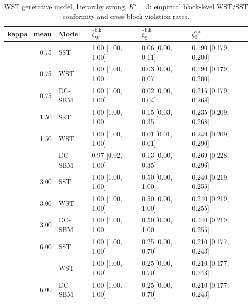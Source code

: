 \begin{table}
\centering
\caption{WST generative model, hierarchy strong, $K^\star=3$: empirical block-level WST/SST conformity and cross-block violation rates.}
\centering
\begin{tabular}[t]{rllll}
\toprule
kappa_mean & Model & $\widehat\zeta_{\mathrm{W}}^{\mathrm{blk}}$ & $\widehat\zeta_{\mathrm{S}}^{\mathrm{blk}}$ & $\zeta^{\mathrm{viol}}_{\hat z}$\\
\midrule
0.75 & SST & 1.00 [1.00, 1.00] & 0.06 [0.00, 0.11] & 0.190 [0.179, 0.200]\\
0.75 & WST & 1.00 [1.00, 1.00] & 0.03 [0.00, 0.07] & 0.190 [0.179, 0.200]\\
0.75 & DC-SBM & 1.00 [1.00, 1.00] & 0.02 [0.00, 0.04] & 0.216 [0.179, 0.268]\\
1.50 & SST & 1.00 [1.00, 1.00] & 0.15 [0.03, 0.35] & 0.235 [0.209, 0.268]\\
1.50 & WST & 1.00 [1.00, 1.00] & 0.01 [0.01, 0.01] & 0.249 [0.209, 0.290]\\
\addlinespace
1.50 & DC-SBM & 0.97 [0.92, 1.00] & 0.13 [0.00, 0.35] & 0.269 [0.228, 0.296]\\
3.00 & SST & 1.00 [1.00, 1.00] & 0.50 [0.00, 1.00] & 0.240 [0.219, 0.255]\\
3.00 & WST & 1.00 [1.00, 1.00] & 0.50 [0.00, 1.00] & 0.240 [0.219, 0.255]\\
3.00 & DC-SBM & 1.00 [1.00, 1.00] & 0.50 [0.00, 1.00] & 0.240 [0.219, 0.255]\\
6.00 & SST & 1.00 [1.00, 1.00] & 0.25 [0.00, 0.70] & 0.210 [0.177, 0.243]\\
\addlinespace
6.00 & WST & 1.00 [1.00, 1.00] & 0.25 [0.00, 0.70] & 0.210 [0.177, 0.243]\\
6.00 & DC-SBM & 1.00 [1.00, 1.00] & 0.25 [0.00, 0.70] & 0.210 [0.177, 0.243]\\
\bottomrule
\end{tabular}
\end{table}

